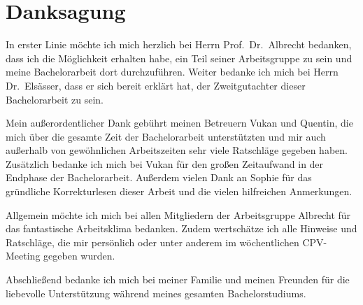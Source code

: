 \chapter*{Danksagung} %

In erster Linie möchte ich mich herzlich bei Herrn Prof.~Dr.~Albrecht bedanken, dass ich die Möglichkeit erhalten habe, ein Teil seiner Arbeitsgruppe zu sein und meine Bachelorarbeit dort durchzuführen.
Weiter bedanke ich mich bei Herrn Dr.~Elsässer, dass er sich bereit erklärt hat, der Zweitgutachter dieser Bachelorarbeit zu sein.

Mein außerordentlicher Dank gebührt meinen Betreuern Vukan und Quentin, die mich über die gesamte Zeit der Bachelorarbeit unterstützten und mir auch außerhalb von gewöhnlichen Arbeitszeiten sehr viele Ratschläge gegeben haben.
Zusätzlich bedanke ich mich bei Vukan für den großen Zeitaufwand in der Endphase der Bachelorarbeit.
Außerdem vielen Dank an Sophie für das gründliche Korrekturlesen dieser Arbeit und die vielen hilfreichen Anmerkungen.

Allgemein möchte ich mich bei allen Mitgliedern der Arbeitsgruppe Albrecht für das fantastische Arbeitsklima bedanken. 
Zudem wertschätze ich alle Hinweise und Ratschläge, die mir persönlich oder unter anderem im wöchentlichen CPV-Meeting gegeben wurden.

Abschließend bedanke ich mich bei meiner Familie und meinen Freunden für die liebevolle Unterstützung während meines gesamten Bachelorstudiums.
